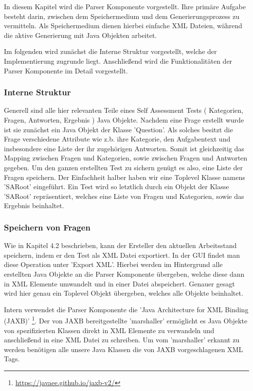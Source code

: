 \label{Tim}
In diesem Kapitel wird die Parser Komponente vorgestellt.
Ihre primäre Aufgabe besteht darin, zwischen dem Speichermedium und dem Generierungsprozess zu vermitteln.
Als Speichermedium dienen hierbei einfache XML Dateien, während die aktive Generierung mit Java Objekten arbeitet.

Im folgenden wird zunächst die Interne Struktur vorgestellt, welche der Implementierung zugrunde liegt. Anschließend wird die Funktionalitäten der Parser Komponente im Detail vorgestellt. 

\subsubsection{Interne Struktur}
Generell sind alle hier relevanten Teile eines Self Assessment Tests ( Kategorien, Fragen, Antworten, Ergebnis ) Java Objekte. 
Nachdem eine Frage erstellt wurde ist sie zunächst ein Java Objekt der Klasse 'Question'.
Als solches besitzt die Frage verschiedene Attribute wie z.b. ihre Kategorie, den Aufgabentext und insbesondere eine Liste der ihr zugehörigen Antworten.
Somit ist gleichzeitig das Mapping zwischen Fragen und Kategorien, sowie zwischen Fragen und Antworten gegeben.
Um den ganzen erstellten Test zu sichern genügt es also, eine Liste der Fragen speichern.
Der Einfachheit halber haben wir eine Toplevel Klasse namens 'SARoot' eingeführt. 
Ein Test wird so letztlich durch ein Objekt der Klasse 'SARoot' repräsentiert, welches eine Liste von Fragen und Kategorien, sowie das Ergebnis beinhaltet.   

\subsubsection{Speichern von Fragen}
Wie in Kapitel 4.2 beschrieben, kann der Ersteller den aktuellen Arbeitsstand speichern, indem er den Test als XML Datei exportiert.
In der GUI findet man diese Operation unter 'Export XML'.
Hierbei werden im Hintergrund alle erstellten Java Objekte an die Parser Komponente übergeben, welche diese dann in XML Elemente umwandelt und in einer Datei abspeichert.
Genauer gesagt wird hier genau ein Toplevel Objekt übergeben, welches alle Objekte beinhaltet.

Intern verwendet die Parser Komponente die 'Java Architecture for XML Binding (JAXB)'
\footnote{\url{https://javaee.github.io/jaxb-v2/}\label{JAXB}}.
Der von JAXB bereitgestellte 'marshaller' ermöglicht es Java Objekte von spezifizierten Klassen direkt in XML Elemente zu verwandeln und anschließend in eine XML Datei zu schreiben.
Um vom 'marshaller' erkannt zu werden benötigen alle unsere Java Klassen die von JAXB vorgeschlagenen XML Tags.

